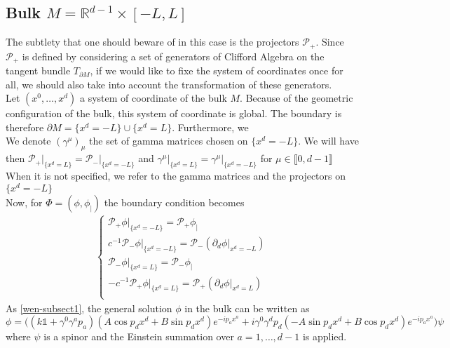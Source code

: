 \subsection{Bulk $M = \mathbb{R}^{d-1} \times [-L, L]$ }
The subtlety that one should beware of in this case is the projectors $\mathcal{P}_+$.
Since $\mathcal{P}_+$ is defined by considering a set of generators of Clifford Algebra on the tangent bundle $T_{ \partial M}$, 
if we would like to fixe the system of coordinates once for all,
we should also take into account the transformation of these generators. \\
Let $(x^0, \ldots, x^d)$ a system of coordinate of the bulk $M$. 
Because of the geometric configuration of the bulk, 
this system of coordinate is global. 
The boundary is therefore $\partial M = \{x^d = -L \} \cup \{ x^d = L \}$.
Furthermore, we  \\
We denote $(\gamma^\mu)_\mu$ the set of gamma matrices chosen on $\{x^d  = - L \}$. 
We will have then $\mathcal{P}_+\vert_{\{x^d = L\}} = \mathcal{P}_-\vert_{\{x^d = -L\}}$ and $\gamma^\mu\vert_{\{x^d = L\}}=\gamma^\mu\vert_{\{x^d = -L\}}$ for $\mu\in\llbracket 0, d-1 \rrbracket$
When it is not specified, we refer to the gamma matrices and the projectors on $\{x^d = -L\}$ \\
Now, for $\Phi = (\phi, \phi_|)$ the boundary condition becomes
\begin{equation*}
\begin{split}
\begin{cases}
\mathcal{P}_+ \phi\vert_{\{x^d = -L\}} = \mathcal{P}_+\phi_| \\
c^{-1}\mathcal{P}_-\phi\vert_{\{x^d = -L\}} = \mathcal{P}_-(\partial_d \phi\vert_{x^d = -L}) \\
\mathcal{P}_- \phi\vert_{\{x^d = L\}} = \mathcal{P}_-\phi_| \\
-c^{-1}\mathcal{P}_+\phi\vert_{\{x^d = L\}} = \mathcal{P}_+(\partial_d \phi\vert_{x^d = L}) \\
\end{cases}
\end{split}
\end{equation*}
As \cref{wen-subsect1}, the general solution $\phi$ in the bulk can be written as
\begin{equation*}
\phi 
 =\Big( (k \mathbb{1}+ \gamma^0\gamma^a p_a )(A \cos p_d x^d + B \sin p_d x^d)e^{-ip_a x^a}
+ i\gamma^0\gamma^d p_d (-A \sin p_d x^d + B \cos p_d x^d) e^{-ip_a x^a} \Big) \psi
 \end{equation*}
 where $\psi $ is a spinor and the Einstein summation over $a = 1, \ldots, d-1$ is applied. \\
